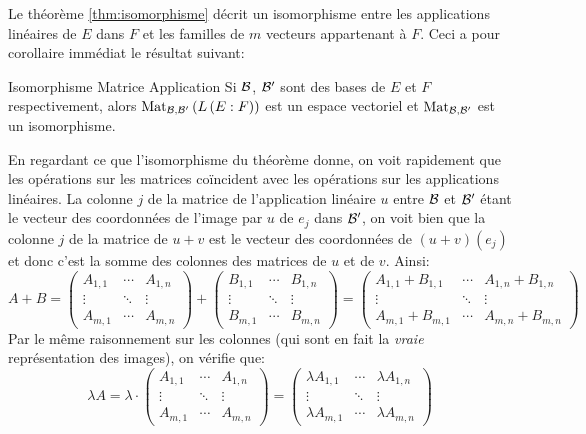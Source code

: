 \documentclass{classe}
\begin{document}
Le théorème \ref{thm:isomorphisme} décrit un isomorphisme entre les applications linéaires de $E$ dans $F$ et les familles de $m$ vecteurs appartenant à $F$.
Ceci a pour corollaire immédiat le résultat suivant:
\begin{théorème}{Isomorphisme Matrice Application}{}
	Si $\mathcal{B}$, $\mathcal{B}'$ sont des bases de $E$ et $F$ respectivement, alors $\operatorname{Mat}_{\mathcal{B}, \mathcal{B}'}\left( L\left( E:F \right) \right)$ est un espace vectoriel et $\operatorname{Mat}_{\mathcal{B}, \mathcal{B}'}$ est un isomorphisme.
\end{théorème}

En regardant ce que l'isomorphisme du théorème donne, on voit rapidement que les opérations sur les matrices coïncident avec les opérations sur les applications linéaires.
La colonne $j$ de la matrice de l'application linéaire $u$ entre $\mathcal{B}$ et $\mathcal{B}'$ étant le vecteur des coordonnées de l'image par $u$ de $e_{j}$ dans $\mathcal{B}'$, on voit bien que la colonne $j$ de la matrice de $u + v$ est le vecteur des coordonnées de $\left( u + v \right)(e_{j})$ et donc c'est la somme des colonnes des matrices de $u$ et de $v$.
Ainsi:
\begin{equation*}
	A + B = \begin{pmatrix}
		A_{1, 1} & \cdots & A_{1, n}\\
		\vdots & \ddots & \vdots\\
		A_{m, 1} & \cdots & A_{m, n}
	\end{pmatrix}
	 +
	 \begin{pmatrix}
		 B_{1, 1} & \cdots & B_{1, n}\\
		 \vdots & \ddots & \vdots\\
		 B_{m, 1} & \cdots & B_{m, n}
	 \end{pmatrix}
	 =
	 \begin{pmatrix}
		 A_{1, 1} + B_{1, 1} & \cdots & A_{1, n} + B_{1, n}\\
		 \vdots & \ddots & \vdots\\
		 A_{m, 1} + B_{m, 1} & \cdots & A_{m, n} + B_{m, n}
	 \end{pmatrix}
\end{equation*}
Par le même raisonnement sur les colonnes (qui sont en fait la \textit{vraie} représentation des images), on vérifie que:
\begin{equation*}
	\lambda A = \lambda \cdot \begin{pmatrix}
		A_{1, 1} & \cdots & A_{1, n}\\
		\vdots & \ddots & \vdots\\
		A_{m, 1} & \cdots & A_{m, n}
	\end{pmatrix}
	= \begin{pmatrix}
		\lambda A_{1, 1} & \cdots & \lambda A_{1, n}\\
		\vdots & \ddots & \vdots \\
		\lambda A_{m, 1} & \cdots & \lambda A_{m, n}
	\end{pmatrix}
\end{equation*}
\end{document}
